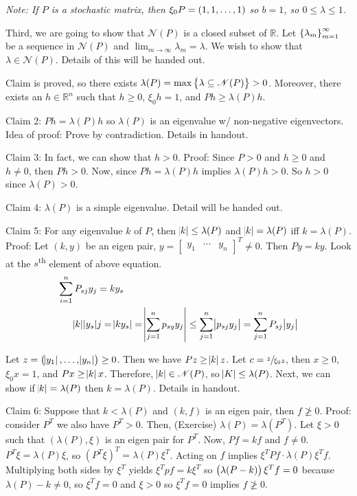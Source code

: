 \documentclass{article}
\newcommand{\m}[1]{\begin{bmatrix} #1 \end{bmatrix}}
\newcommand{\RR}{\mathbb{R}}
\begin{document}
\textit{Note: If \(P\) is a stochastic matrix, then \(\xi_0P = \del{1, 1, \dots, 1}\) so \(b = 1\), so \(0 \leq \lambda \leq 1\).}

Third, we are going to show that \(\mathscr N(P)\) is a closed subset of \(\RR\).
Let \(\set{\lambda_m}_{m=1}^\infty\) be a sequence in \(\mathscr N(P)\) and \(\lim_{m \to \infty} \lambda_m = \lambda\).
We wish to show that \(\lambda \in \mathscr N(P)\).
Details of this will be handed out.

Claim is proved, so there exists \(\lambda(P) = \max\set{\lambda \subseteq \mathscr{N}(P)} > 0\).
Moreover, there exists an  \(h \in \RR^n\) such that \(h \geq 0\), \(\xi_0h=1\), and \(Ph \geq \lambda(P)h\).

Claim 2: \(Ph = \lambda(P)h\) so \(\lambda(P)\) is an eigenvalue w/ non-negative eigenvectors.
Idea of proof: Prove by contradiction.
Details in handout.

Claim 3: In fact, we can show that \(h > 0\).
Proof: Since \(P > 0\) and \(h \geq 0\) and \(h \neq 0\), then \(Ph > 0\).
Now, since \(Ph = \lambda(P)h\) implies \(\lambda(P)h > 0\).
So \(h > 0\) since \(\lambda(P) > 0\).

Claim 4: \(\lambda(P)\) is a simple eigenvalue.
Detail will be handed out.

Claim 5: For any eigenvalue  \(k\) of \(P\), then \(\abs{k} \leq \lambda(P)\) and \(\abs{k} = \lambda(P)\) iff \(k = \lambda(P)\).
Proof: Let \((k, y)\) be an eigen pair, \(y = \m{y_1 & \cdots & y_n}^T\neq 0\).
Then \(Py = ky\).
Look at the \(s\)\textsuperscript{th} element of above equation.
\begin{align*}
  \sum_{i = 1}^n P_{sj}y_j &= ky_s\\
  \abs{k}\abs{y_s} &j= \abs{ky_s} = \abs{\sum_{j=1}^n p_{sy} y_j} \leq \sum_{j = 1}^n \abs{p_{sj}y_j} = \sum_{j=1}^n P_{sj}\abs{y_j}
\end{align*}

Let \(z = \del{\abs{y_1}, \dots, \abs{y_n}} \geq 0\).
Then we have \(Pz \geq \abs{k}z\).
Let \(c = \sfrac{z}{\xi_0z}\), then \(x \geq 0\), \(\xi_0x = 1\), and \(Px \geq \abs{k}x\).
Therefore, \(\abs{k} \in \mathscr N(P)\), so \(\abs{K} \leq \lambda(P)\).
Next, we can show if \(\abs{k} = \lambda(P)\) then \(k = \lambda(P)\).
Details in handout.

Claim 6: Suppose that \(k < \lambda(P)\) and \((k, f)\) is an eigen pair, then \(f \not\ge 0\).
Proof: consider \(P^T\) we also have \(P^T > 0\).
Then, (Exercise) \(\lambda(P) = \lambda(P^T)\).
Let \(\xi > 0\) such that \((\lambda(P), \xi)\) is an eigen pair for \(P^T\).
Now, \(Pf = kf\) and \(f \neq 0\).
\(P^T\xi = \lambda(P)\xi\), so \((P^T\xi)^T = \lambda(P)\xi^T\).
Acting on \(f\) implies \(\xi^TPf \cdot \lambda(P)\xi^Tf\).
Multiplying both sides by \(\xi^T\) yields \(\xi^Tpf = k\xi^T\) so \(\del{\lambda(P - k)}\xi^Tf = 0\) because \(\lambda(P) - k \neq 0\), so \(\xi^Tf = 0\) and \(\xi>0\) so \(\xi^Tf = 0\) implies \(f \not\geq 0\).
\end{document}
